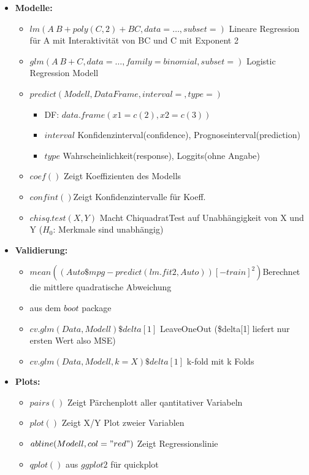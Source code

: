 \documentclass[a4paper]{article}
\begin{document}
\begin{landscape}
\begin{multicols}{3}
\begin{itemize} [noitemsep,nolistsep,leftmargin=*]
            \item \textbf{Modelle:}
            \begin{itemize}[noitemsep,nolistsep,leftmargin=*]
            \item $lm(A ~ B + poly(C,2) + BC, data = \dots, subset=)$ Lineare Regression für A mit Interaktivität von BC und C mit Exponent 2
            \item $glm(A ~ B + C, data=\dots, family = binomial, subset=)$ Logistic Regression Modell
            \item $predict(Modell, DataFrame, interval= , type= )$
                \begin{itemize}[noitemsep,nolistsep,leftmargin=*]
                    \item DF: $data.frame(x1 = c(2), x2 = c(3))$ 
                    \item $interval$ Konfidenzinterval(confidence), Prognoseinterval(prediction)
                    \item $type$ Wahrscheinlichkeit(response), Loggits(ohne Angabe)
                \end{itemize}
            \item $coef()$ Zeigt Koeffizienten des Modells
            \item $confint()$Zeigt  Konfidenzintervalle für Koeff.
            \item $chisq.test(X,Y)$ Macht ChiquadratTest auf Unabhängigkeit von X und Y ($H_0$: Merkmale sind unabhängig)
            \end{itemize}

            \item \textbf{Validierung:}
            \begin{itemize}[noitemsep,nolistsep,leftmargin=*]
                \item $mean((Auto\$mpg - predict(lm.fit2, Auto))[-train]^2) $Berechnet die mittlere quadratische Abweichung
                \item aus dem $boot$ package
                \item $cv.glm(Data,Modell)\$delta[1]$ LeaveOneOut (\$delta[1] liefert nur ersten Wert also MSE)
                \item $cv.glm(Data,Modell, k=X)\$delta[1]$ k-fold mit k Folds
            \end{itemize}

            \item \textbf{Plots:}
            \begin{itemize}[noitemsep,nolistsep,leftmargin=*]
                \item $pairs()$ Zeigt Pärchenplott aller qantitativer Variabeln
                \item $plot()$ Zeigt X/Y Plot zweier Variablen
                \item $abline(Modell, col="red")$ Zeigt Regressionslinie
                \item $qplot()$ aus $ggplot2$ für quickplot
            \end{itemize}
        \end{itemize}
    

\end{multicols}
\end{landscape}
\end{document}
